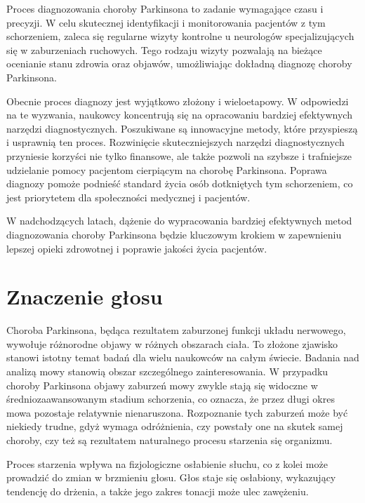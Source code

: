 Proces diagnozowania choroby Parkinsona to zadanie wymagające czasu i precyzji.
W celu skutecznej identyfikacji i monitorowania pacjentów z tym schorzeniem, zaleca się regularne wizyty kontrolne u neurologów specjalizujących się w zaburzeniach ruchowych. Tego rodzaju wizyty pozwalają na bieżące ocenianie stanu zdrowia oraz objawów, umożliwiając dokładną diagnozę choroby Parkinsona.

Obecnie proces diagnozy jest wyjątkowo złożony i wieloetapowy.
W odpowiedzi na te wyzwania, naukowcy koncentrują się na opracowaniu bardziej efektywnych narzędzi diagnostycznych.
Poszukiwane są innowacyjne metody, które przyspieszą i usprawnią ten proces.
Rozwinięcie skuteczniejszych narzędzi diagnostycznych przyniesie korzyści nie tylko finansowe, ale także pozwoli na szybsze i trafniejsze udzielanie pomocy pacjentom cierpiącym na chorobę Parkinsona.
Poprawa diagnozy pomoże podnieść standard życia osób dotkniętych tym schorzeniem, co jest priorytetem dla społeczności medycznej i pacjentów.

W nadchodzących latach, dążenie do wypracowania bardziej efektywnych metod diagnozowania choroby Parkinsona będzie kluczowym krokiem w zapewnieniu lepszej opieki zdrowotnej i poprawie jakości życia pacjentów.


\section{Znaczenie głosu}
\label{sec:znaczenie_glosu}
Choroba Parkinsona, będąca rezultatem zaburzonej funkcji układu nerwowego, wywołuje różnorodne objawy w różnych obszarach ciała.
To złożone zjawisko stanowi istotny temat badań dla wielu naukowców na całym świecie.
Badania nad analizą mowy stanowią obszar szczególnego zainteresowania.
W przypadku choroby Parkinsona objawy zaburzeń mowy zwykle stają się widoczne w średniozaawansowanym stadium schorzenia, co oznacza, że przez długi okres mowa pozostaje relatywnie nienaruszona.
Rozpoznanie tych zaburzeń może być niekiedy trudne, gdyż wymaga odróżnienia, czy powstały one na skutek samej choroby, czy też są rezultatem naturalnego
procesu starzenia się organizmu.

Proces starzenia wpływa na fizjologiczne osłabienie słuchu, co z kolei może prowadzić do zmian w brzmieniu głosu.
Głos staje się osłabiony, wykazujący tendencję do drżenia, a także jego zakres tonacji może ulec zawężeniu.


